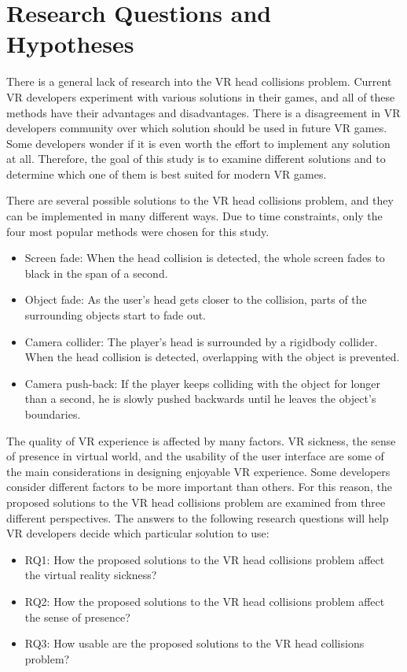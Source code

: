 \section{Research Questions and Hypotheses}

There is a general lack of research into the VR head collisions problem. Current VR developers experiment with various solutions in their games, and all of these methods have their advantages and disadvantages. There is a disagreement in VR developers community over which solution should be used in future VR games. Some developers wonder if it is even worth the effort to implement any solution at all. Therefore, the goal of this study is to examine different solutions and to determine which one of them is best suited for modern VR games.
 
There are several possible solutions to the VR head collisions problem, and they can be implemented in many different ways. Due to time constraints, only the four most popular methods were chosen for this study.

\begin{itemize}
\item Screen fade: When the head collision is detected, the whole screen fades to black in the span of a second.
\item Object fade: As the user's head gets closer to the collision, parts of the surrounding objects start to fade out.
\item Camera collider: The player's head is surrounded by a rigidbody collider. When the head collision is detected, overlapping with the object is prevented.
\item Camera push-back: If the player keeps colliding with the object for longer than a second, he is slowly pushed backwards until he leaves the object's boundaries.
\end{itemize}

The quality of VR experience is affected by many factors. VR sickness, the sense of presence in virtual world, and the usability of the user interface are some of the main considerations in designing enjoyable VR experience. Some developers consider different factors to be more important than others. For this reason, the proposed solutions to the VR head collisions problem are examined from three different perspectives. The answers to the following research questions will help VR developers decide which particular solution to use:

\begin{itemize}
\item RQ1: How the proposed solutions to the VR head collisions problem affect the virtual reality sickness?
\item RQ2: How the proposed solutions to the VR head collisions problem affect the sense of presence?
\item RQ3: How usable are the proposed solutions to the VR head collisions problem?
\end{itemize}

